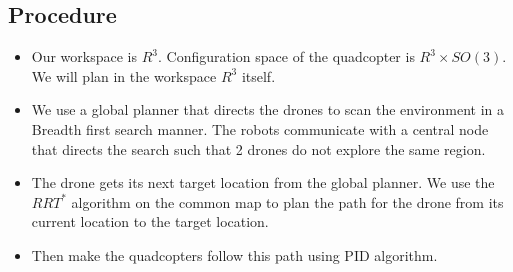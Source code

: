 \subsection{Procedure}
\begin{itemize}
    \item Our workspace is \(R^3\). Configuration space of the quadcopter is \(R^3 \times SO(3)\). We will plan in the workspace \(R^3\) itself. 
    \item We use a global planner that directs the drones to scan the environment in a Breadth first search manner. The robots communicate with a central node that directs the search such that 2 drones do not explore the same region.
    \item The drone gets its next target location from the global planner. We use the \(RRT^*\) algorithm on the common map to plan the path for the drone from its current location to the target location.
    \item Then make the quadcopters follow this path using PID algorithm.
\end{itemize}

